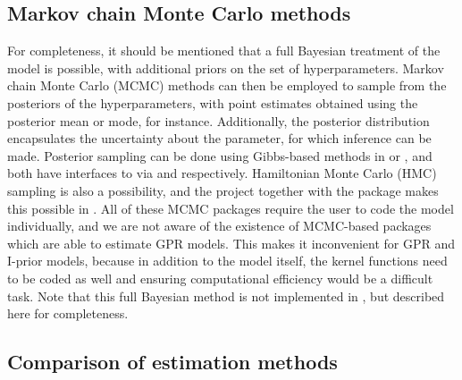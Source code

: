 \subsection{Markov chain Monte Carlo methods}

For completeness, it should be mentioned that a full Bayesian treatment of the model is possible, with additional priors on the set of hyperparameters.
Markov chain Monte Carlo (MCMC) methods can then be employed to sample from the posteriors of the hyperparameters, with point estimates obtained using the posterior mean or mode, for instance.
Additionally, the posterior distribution encapsulates the uncertainty about the parameter, for which inference can be made.
Posterior sampling can be done using Gibbs-based methods in  \citep{lunn2000winbugs} or  \citep{plummer2003jags}, and both have interfaces to  via  \citep{sturtz2005r2winbugs} and  \citep{denwood2016runjags} respectively.
Hamiltonian Monte Carlo (HMC) sampling is also a possibility, and the  project \citep{carpenter2016stan} together with the package  \citep{rstan}  makes this possible in .
All of these MCMC packages require the user to code the model individually, and we are not aware of the existence of MCMC-based packages which are able to estimate GPR models.
This makes it inconvenient for GPR and I-prior models, because in addition to the model itself, the kernel functions need to be coded as well and ensuring computational efficiency would be a difficult task.
Note that this full Bayesian method is not implemented in , but described here for completeness.

\subsection{Comparison of estimation methods}

